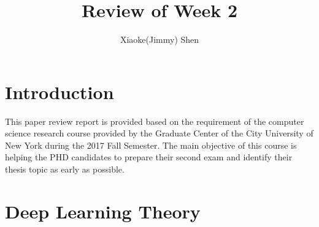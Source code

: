 \documentclass[a4paper,12pt]{article}
\begin{document}
\renewcommand\labelenumi{(\theenumi)}
\renewcommand{\vec}[1]{\mathbf{#1}}
\title {Review of Week 2 }
\author{Xiaoke(Jimmy) Shen}
\maketitle
\section{Introduction}

This paper review report is provided based on the requirement of the computer science research course provided by the Graduate Center of the City University of New York during the 2017 Fall Semester. The main objective of this course is helping the PHD candidates to prepare their second exam and identify their thesis topic as early as possible\cite{ji2017}. \\

\section{Deep Learning Theory}
\end{document}
